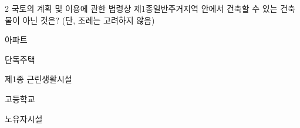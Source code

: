 \begin{question}{2}
국토의 계획 및 이용에 관한 법령상 제1종일반주거지역 안에서 건축할 수 있는 건축물이 아닌 것은? (단, 조례는 고려하지 않음)
\begin{choices}
  \item 아파트
  \item 단독주택
  \item 제1종 근린생활시설
  \item 고등학교
  \item 노유자시설
\end{choices}
\end{question}
